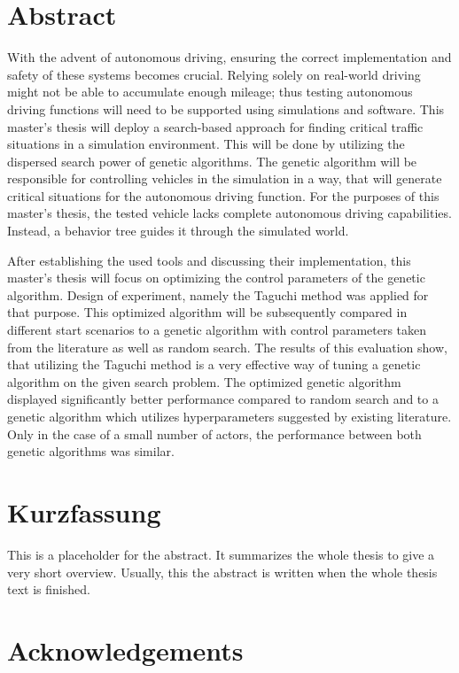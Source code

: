 \chapter*{Abstract}
\label{chap:abstract}

With the advent of autonomous driving, ensuring the correct implementation and safety of these systems becomes crucial. Relying solely on real-world driving might not be able to accumulate enough mileage; thus testing autonomous driving functions will need to be supported using simulations and software. This master's thesis will deploy a search-based approach for finding critical traffic situations in a simulation environment. This will be done by utilizing the dispersed search power of genetic algorithms. The genetic algorithm will be responsible for controlling vehicles in the simulation in a way, that will generate critical situations for the autonomous driving function. For the purposes of this master's thesis, the tested vehicle lacks complete autonomous driving capabilities. Instead, a behavior tree guides it through the simulated world.

After establishing the used tools and discussing their implementation, this master's thesis will focus on optimizing the control parameters of the genetic algorithm. Design of experiment, namely the Taguchi method was applied for that purpose. This optimized algorithm will be subsequently compared in different start scenarios to a genetic algorithm with control parameters taken from the literature as well as random search. The results of this evaluation show, that utilizing the Taguchi method is a very effective way of tuning a genetic algorithm on the given search problem. The optimized genetic algorithm displayed significantly better performance compared to random search and to a genetic algorithm which utilizes hyperparameters suggested by existing literature. Only in the case of a small number of actors, the performance between both genetic algorithms was similar.


\chapter*{Kurzfassung}
\label{chap:kurzfassung}


This is a placeholder for the abstract. It summarizes the whole thesis
to give a very short overview. Usually, this the abstract is written
when the whole thesis text is finished.


\chapter*{Acknowledgements}
\label{chap:acknowledgements}

